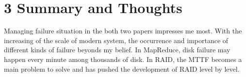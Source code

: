 \documentclass[a4paper]{article}
\begin{document}
 \section*{3 Summary and Thoughts}
 Managing failure situation in the both two papers impresses me most. With the increasing of  the scale of modern system, the occurrence and importance of different kinds of failure beyonds my belief. In MapReduce, disk failure may happen every minute among thousands of disk. In RAID, the MTTF becomes a main problem to solve and has pushed the development of RAID level by level.
\end{document}
